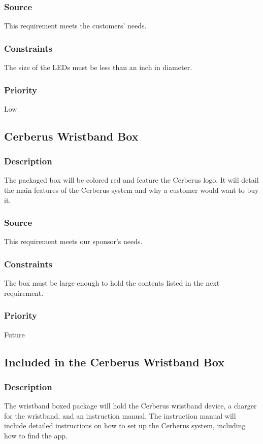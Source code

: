 \subsubsection{Source}
This requirement meets the customers' needs.
\subsubsection{Constraints}
The size of the LEDs must be less than an inch in diameter.
\subsubsection{Priority}
Low

\subsection{Cerberus Wristband Box}
\subsubsection{Description}
The packaged box will be colored red and feature the Cerberus logo. It will detail the main features of the Cerberus system and why a customer would want to buy it.
\subsubsection{Source}
This requirement meets our sponsor's needs.
\subsubsection{Constraints}
The box must be large enough to hold the contents listed in the next requirement.
\subsubsection{Priority}
Future

\subsection{Included in the Cerberus Wristband Box}
\subsubsection{Description}
The wristband boxed package will hold the Cerberus wristband device, a charger for the wristband, and an instruction manual. The instruction manual will include detailed instructions on how to set up the Cerberus system, including how to find the app.
